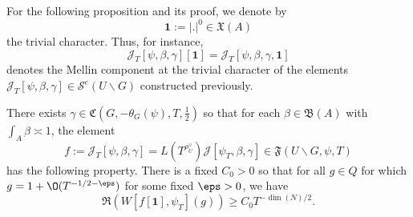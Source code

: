 For the following proposition and its proof, we denote by
\begin{equation*}
  \mathbf{1} := |.|^0 \in \mathfrak{X}(A)
\end{equation*}
the trivial character.  Thus, for instance,
\begin{equation*}
  \mathcal{J}_T[\psi,\beta,\gamma][\mathbf{1}] =
  \mathcal{J}_T[\psi,\beta,\gamma,\mathbf{1}]
\end{equation*}
denotes the Mellin component at the trivial character of the elements $\mathcal{J}_T[\psi,\beta,\gamma] \in \mathcal{S}^e(U \backslash G)$ constructed previously.
\begin{proposition}\label{prop:there-exists-gamma}
  There exists $\gamma \in \mathfrak{C}(G,-\theta_G(\psi),T,\tfrac{1}{2})$ so that for each $\beta \in \mathfrak{B}(A)$ with $\int_{A} \beta \asymp 1$, the element
  \begin{equation}\label{eq:f-:=-mathcalj_tpsi}
    f := \mathcal{J}_T[\psi,\beta,\gamma] = L (T^{\rho_U^\vee }) \mathcal{J}[\psi_T,\beta,\gamma] \in \mathfrak{F}(U \backslash G, \psi, T)
  \end{equation}
  has the following property.  There is a fixed $C_0 > 0$ so that for all $g \in Q$ for which $g = 1 + \O(T^{-1/2-\eps})$ for some fixed $\eps > 0$, we have
  \begin{equation}\label{eq:real-part-W-lower-bound}
    \Re(W[f[\mathbf{1}], \psi_T](g)) \geq C_0 T^{-\dim(N)/2}.
  \end{equation}
\end{proposition}
